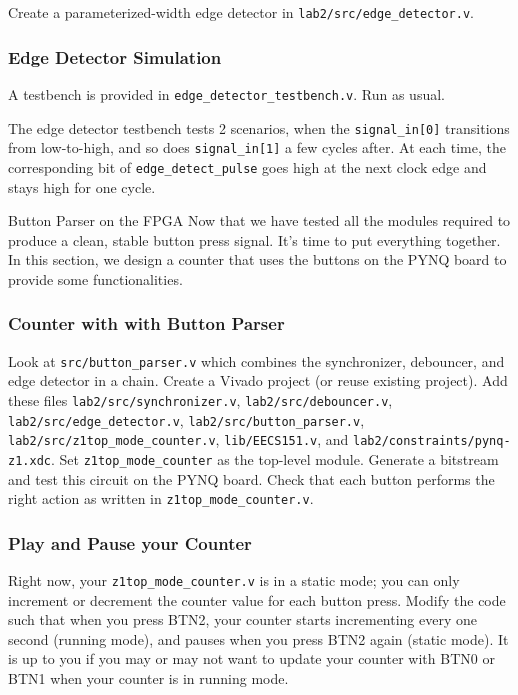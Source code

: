 \documentclass[11pt]{article}
\makeatletter
\renewcommand{\subsection}
{\@startsection {subsection}{1}{0pt}
 {-1ex}
 {0.5ex}
 {\bfseries\normalsize}}
\makeatother
\begin{document}
Create a parameterized-width edge detector in \verb|lab2/src/edge_detector.v|.

\subsubsection{Edge Detector Simulation}
A testbench is provided in \verb|edge_detector_testbench.v|. Run as usual.

The edge detector testbench tests 2 scenarios, when the \verb|signal_in[0]| transitions from low-to-high, and so does \verb|signal_in[1]| a few cycles after. At each time, the corresponding bit of \verb|edge_detect_pulse| goes high at the next clock edge and stays high for one cycle.

\subsection{Button Parser on the FPGA}
Now that we have tested all the modules required to produce a clean, stable button press signal. It's time to put everything together. In this section, we design a counter that uses the buttons on the PYNQ board to provide some functionalities.

\subsubsection{Counter with with Button Parser}
Look at \verb|src/button_parser.v| which combines the synchronizer, debouncer, and edge detector in a chain.
Create a Vivado project (or reuse existing project). Add these files \verb|lab2/src/synchronizer.v|, \verb|lab2/src/debouncer.v|, \verb|lab2/src/edge_detector.v|, \verb|lab2/src/button_parser.v|, \verb|lab2/src/z1top_mode_counter.v|, \verb|lib/EECS151.v|, and \verb|lab2/constraints/pynq-z1.xdc|. Set \verb|z1top_mode_counter| as the top-level module. Generate a bitstream and test this circuit on the PYNQ board. Check that each button performs the right action as written in \texttt{z1top\_mode\_counter.v}.

\subsubsection{Play and Pause your Counter}

Right now, your \texttt{z1top\_mode\_counter.v} is in a static mode; you can only increment or decrement the counter value for each button press. Modify the code such that when you press BTN2, your counter starts incrementing every one second (running mode), and pauses when you press BTN2 again (static mode). It is up to you if you may or may not want to update your counter with BTN0 or BTN1 when your counter is in running mode.
\end{document}
